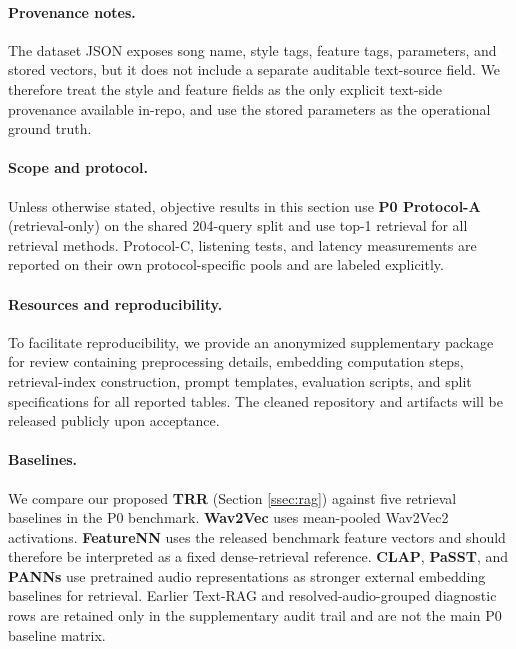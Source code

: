 \paragraph{Provenance notes.}
The dataset JSON exposes song name, style tags, feature tags, parameters, and stored vectors, but it does not include a separate auditable text-source field. We therefore treat the style and feature fields as the only explicit text-side provenance available in-repo, and use the stored parameters as the operational ground truth.

\paragraph{Scope and protocol.}
Unless otherwise stated, objective results in this section use \textbf{P0 Protocol-A} (retrieval-only) on the shared 204-query split and use top-1 retrieval for all retrieval methods. Protocol-C, listening tests, and latency measurements are reported on their own protocol-specific pools and are labeled explicitly.

\paragraph{Resources and reproducibility.}
\label{sec:repro}
To facilitate reproducibility, we provide an anonymized supplementary package for review containing preprocessing details, embedding computation steps, retrieval-index construction, prompt templates, evaluation scripts, and split specifications for all reported tables. The cleaned repository and artifacts will be released publicly upon acceptance.

\paragraph{Baselines.}
We compare our proposed \textbf{TRR} (Section \ref{ssec:rag}) against five retrieval baselines in the P0 benchmark. \textbf{Wav2Vec} uses mean-pooled Wav2Vec2 activations. \textbf{FeatureNN} uses the released benchmark feature vectors and should therefore be interpreted as a fixed dense-retrieval reference. \textbf{CLAP}, \textbf{PaSST}, and \textbf{PANNs} use pretrained audio representations as stronger external embedding baselines for retrieval. Earlier Text-RAG and resolved-audio-grouped diagnostic rows are retained only in the supplementary audit trail and are not the main P0 baseline matrix.

